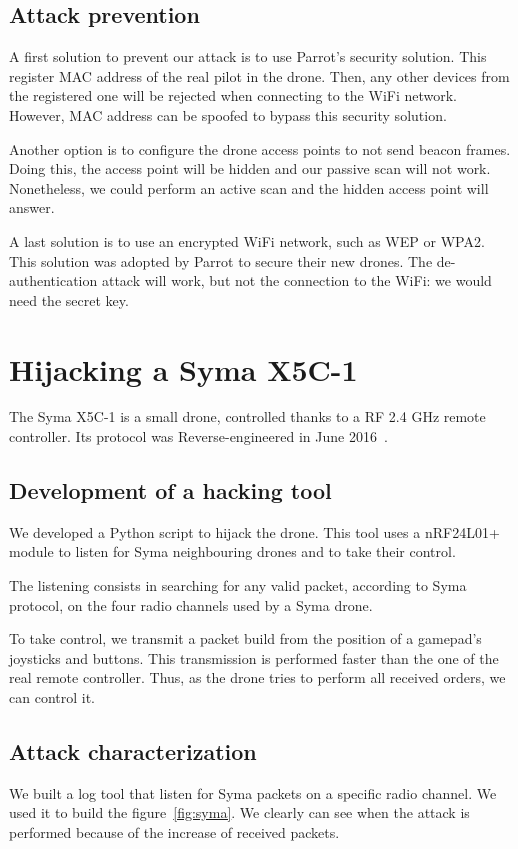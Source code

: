 \documentclass[conference,a4paper]{IEEEtran}
\begin{document}
\subsection{Attack prevention}
A first solution to prevent our attack is to use Parrot's security solution. This
register MAC address of the real pilot in the drone. Then, any other devices from the
registered one will be rejected when connecting to the WiFi network. However, MAC address
can be spoofed to bypass this security solution.

Another option is to configure the drone access points to not send beacon frames. Doing
this, the access point will be hidden and our passive scan will not work. Nonetheless, we
could perform an active scan and the hidden access point will answer.

A last solution is to use an encrypted WiFi network, such as WEP or WPA2. This solution
was adopted by Parrot to secure their new drones. The de-authentication attack will work,
but not the connection to the WiFi: we would need the secret key.



\section{Hijacking a Syma X5C-1}
The Syma X5C-1 is a small drone, controlled thanks to a RF 2.4 GHz remote controller. Its
protocol was Reverse-engineered in June 2016~\cite{bib:syma}.

\subsection{Development of a hacking tool}
We developed a Python script to hijack the drone. This tool uses a nRF24L01+ module to
listen for Syma neighbouring drones and to take their control.

The listening consists in searching for any valid packet, according to Syma protocol, on
the four radio channels used by a Syma drone.

To take control, we transmit a packet build from the position of a gamepad's joysticks and
buttons. This transmission is performed faster than the one of the real remote controller.
Thus, as the drone tries to perform all received orders, we can control it.

\subsection{Attack characterization}
We built a log tool that listen for Syma packets on a specific radio channel. We used it
to build the figure~\ref{fig:syma}. We clearly can see when the attack is performed
because of the increase of received packets.
\end{document}
